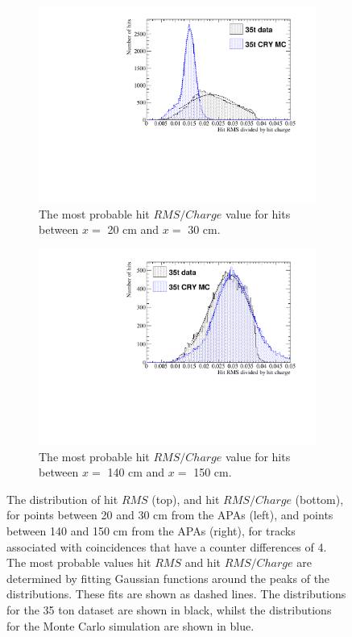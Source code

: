 \begin{figure}
\begin{subfigure}{0.48\textwidth}
    \includegraphics[width=\textwidth]{CombCan_2}
    \caption{The most probable hit $RMS/Charge$ value for hits between $x =$ 20 cm and $x =$ 30 cm.}
  \end{subfigure}%
  \hspace{0.03\textwidth}%
  \begin{subfigure}{0.48\textwidth}
    \centering
    \includegraphics[width=\textwidth]{CombCan_3}
    \caption{The most probable hit $RMS/Charge$ value for hits between $x =$ 140 cm and $x =$ 150 cm.}
    \label{fig:DiffMCHitFit_3}
  \end{subfigure}
  \caption[The most probable values of the $RMS$ and $RMS/Charge$ distributions for tracks with a counter difference of 4 in the 35 ton data and a low noise 35 ton detector]
          {The distribution of hit $RMS$ (top), and hit $RMS/Charge$ (bottom), for points between 20 and 30 cm from the APAs (left), and points between 140 and 150 cm from the APAs (right), for tracks associated with coincidences that have a counter differences of 4. The most probable values hit $RMS$ and hit $RMS/Charge$ are determined by fitting Gaussian functions around the peaks of the distributions. These fits are shown as dashed lines. The distributions for the 35 ton dataset are shown in black, whilst the distributions for the Monte Carlo simulation are shown in blue.}
          \label{fig:DiffMCHitFit}
\end{figure}

